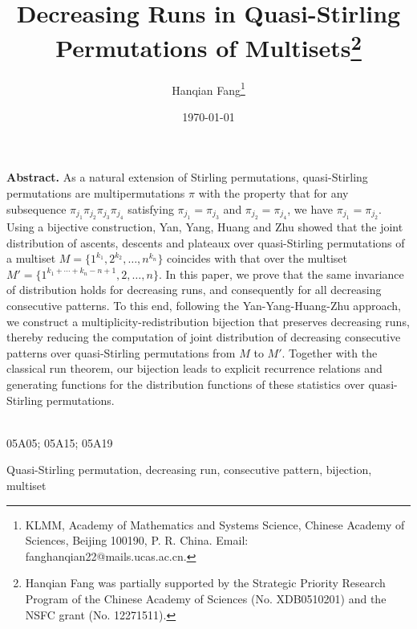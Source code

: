 \documentclass[11pt]{article}
\numberwithin{equation}{section}
\begin{document}
\title{Decreasing Runs in Quasi-Stirling Permutations of Multisets\thanks{Hanqian Fang was partially supported by the Strategic Priority Research Program of the Chinese Academy of Sciences (No. XDB0510201) and the NSFC grant (No. 12271511).
}}

\author{Hanqian Fang\footnote{KLMM, Academy of Mathematics and Systems Science, Chinese Academy of Sciences, Beijing 100190, P. R. China.  Email: fanghanqian22@mails.ucas.ac.cn.}}

\date{\today}

\maketitle

\noindent\textbf{Abstract.} As a natural extension of Stirling permutations, quasi-Stirling permutations are multipermutations $\pi$ with the property that for any subsequence $\pi_{j_1}\pi_{j_2}\pi_{j_3}\pi_{j_4}$ satisfying $\pi_{j_1}=\pi_{j_3}$ and $\pi_{j_2}=\pi_{j_4}$, we have $\pi_{j_1}=\pi_{j_2}$. Using a bijective construction, Yan, Yang, Huang and Zhu showed that the joint distribution of ascents, descents and plateaux over quasi-Stirling permutations of a multiset $M=\{1^{k_1},2^{k_2},\ldots,n^{k_n}\}$ coincides with that over the multiset $M'=\{1^{k_1+\cdots+k_n-n+1},2,\ldots,n\}$. In this paper, we prove that the same invariance of distribution holds for decreasing runs, and consequently for all decreasing consecutive patterns. To this end, following the Yan-Yang-Huang-Zhu approach, we construct a multiplicity-redistribution bijection that preserves decreasing runs, thereby reducing the computation of joint distribution of decreasing consecutive patterns over quasi-Stirling permutations from $M$ to $M'$. Together with the classical run theorem, our bijection leads to explicit recurrence relations and generating functions for the distribution functions of these statistics over quasi-Stirling permutations.


\qquad\\

 05A05; 05A15; 05A19

 Quasi-Stirling permutation, decreasing run, consecutive pattern, bijection, multiset

\tableofcontents


\newpage
\end{document}
